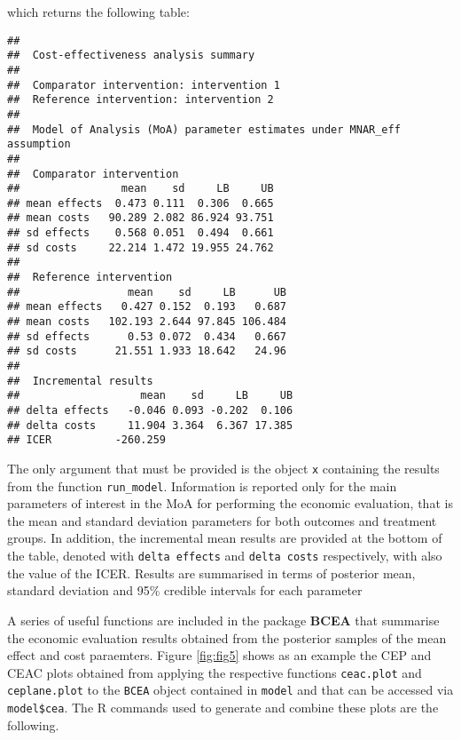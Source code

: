 \documentclass[]{article}
\newenvironment{Shaded}{\begin{snugshade}}{\end{snugshade}}
\newcommand{\KeywordTok}[1]{\textcolor[rgb]{0.13,0.29,0.53}{\textbf{{#1}}}}
\newcommand{\DataTypeTok}[1]{\textcolor[rgb]{0.13,0.29,0.53}{{#1}}}
\newcommand{\StringTok}[1]{\textcolor[rgb]{0.31,0.60,0.02}{{#1}}}
\newcommand{\NormalTok}[1]{{#1}}
\begin{document}
which returns the following table:

\begin{verbatim}
## 
##  Cost-effectiveness analysis summary 
##  
##  Comparator intervention: intervention 1 
##  Reference intervention: intervention 2 
##  
##  Model of Analysis (MoA) parameter estimates under MNAR_eff assumption
##  
##  Comparator intervention 
##                mean    sd     LB     UB
## mean effects  0.473 0.111  0.306  0.665
## mean costs   90.289 2.082 86.924 93.751
## sd effects    0.568 0.051  0.494  0.661
## sd costs     22.214 1.472 19.955 24.762
## 
##  Reference intervention 
##                 mean    sd     LB      UB
## mean effects   0.427 0.152  0.193   0.687
## mean costs   102.193 2.644 97.845 106.484
## sd effects      0.53 0.072  0.434   0.667
## sd costs      21.551 1.933 18.642   24.96
## 
##  Incremental results 
##                   mean    sd     LB     UB
## delta effects   -0.046 0.093 -0.202  0.106
## delta costs     11.904 3.364  6.367 17.385
## ICER          -260.259
\end{verbatim}

The only argument that must be provided is the object \texttt{x}
containing the results from the function \texttt{run\_model}.
Information is reported only for the main parameters of interest in the
MoA for performing the economic evaluation, that is the mean and
standard deviation parameters for both outcomes and treatment groups. In
addition, the incremental mean results are provided at the bottom of the
table, denoted with \texttt{delta effects} and \texttt{delta costs}
respectively, with also the value of the ICER. Results are summarised in
terms of posterior mean, standard deviation and 95\% credible intervals
for each parameter

A series of useful functions are included in the package \textbf{BCEA}
that summarise the economic evaluation results obtained from the
posterior samples of the mean effect and cost paraemters. Figure
\ref{fig:fig5} shows as an example the CEP and CEAC plots obtained from
applying the respective functions \texttt{ceac.plot} and
\texttt{ceplane.plot} to the \texttt{BCEA} object contained in
\texttt{model} and that can be accessed via \texttt{model\$cea}. The R
commands used to generate and combine these plots are the following.

\begin{Shaded}
\end{Shaded}
\end{document}
